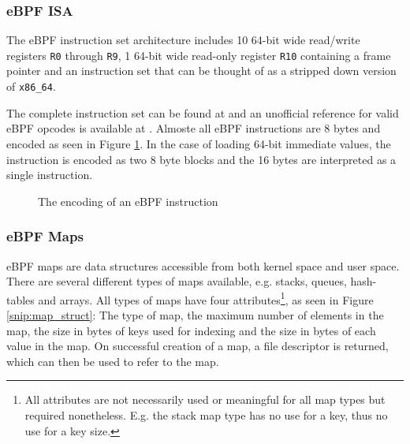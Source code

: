 \subsubsection{eBPF ISA}

The eBPF instruction set architecture includes 10 64-bit wide read/write registers \verb!R0! through \verb!R9!, 1 64-bit wide read-only register \verb!R10! containing a frame pointer and an instruction set that can be thought of as a stripped down version of \verb!x86_64!. 

The complete instruction set can be found at \cite{kernel:ebpf-inst} and an unofficial reference for valid eBPF opcodes is available at \cite{ebpf-unoff-spec}.
Almoste all eBPF instructions are 8 bytes and encoded as seen in Figure \ref{fig:ebpf-encoding}. In the case of loading 64-bit immediate values, the instruction is encoded as two 8 byte blocks and the 16 bytes are interpreted as a single instruction.


\begin{figure}[htbp!]
  \centering
  \caption{The encoding of an eBPF instruction}
  \label{fig:ebpf-encoding}
\end{figure}




\subsubsection{eBPF Maps}

eBPF maps are data structures accessible from both kernel space and user space.
There are several different types of maps available, e.g. stacks, queues, hash-tables and arrays.
All types of maps have four attributes\footnote{All attributes are not necessarily used or meaningful for all map types but required nonetheless. E.g. the stack map type has no use for a key, thus no use for a key size.}, as seen in Figure \ref{snip:map_struct}: The type of map, the maximum number of elements in the map, the size in bytes of keys used for indexing and the size in bytes of each value in the map. On successful creation of a map, a file descriptor is returned, which can then be used to refer to the map. 


